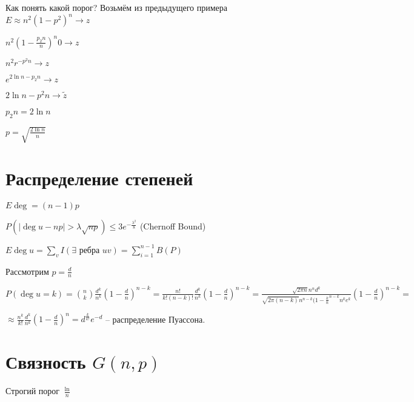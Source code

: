 \documentclass{book}
\theoremstyle{definition}
\newcommand{\tl}[1]{\widetilde{#1}}
\begin{document}
Как понять какой порог? Возьмём из предыдущего примера $E \approx n^2(1-p^2)^n \to z$

$n^2\left( 1 - \frac{p_2n}{n} \right) ^n 0\to z$

$n^2r^{-p^2n} \to z$

$e^{2\ln n - p_2n} \to z$

$2\ln n - p^2n \to \tl z$

$p_2n = 2\ln  n$

$p = \sqrt{\frac{2\ln n}{n}} $



\section{Распределение степеней}

$E\deg = (n-1)p$

 \begin{theorem}
     $P\left( \left| \deg u - np \right| >\lambda \sqrt{np}  \right) \leqslant 3 e^{-\frac{\lambda^2}{8}}$ (Chernoff Bound)

     $E \deg u = \sum_v I\left( \exists \text{ ребра }uv \right)  = \sum_{i=1}^{n-1} B(P)$
\end{theorem}

Рассмотрим $p = \frac{d}{n}$ 

$P(\deg u = k) = {n\choose k}\frac{d^k}{n^k}\left( 1 - \frac{d}{n} \right) ^{n-k} = \frac{n!}{k!(n-k)!} \frac{d^k}{n^k}\left( 1 - \frac{d}{n} \right) ^{n-k} = \frac{\sqrt{2\pi n} n^nd^k}{ \sqrt{2\pi (n-k)} n^{n-k}(1 - \frac{k}{n}^{n-k}n^k e^k}\left( 1 - \frac{d}{n} \right) ^{n-k} = $

$\approx \frac{n^k}{k!}\frac{d^k}{n^k}\left( 1 - \frac{d}{n} \right) ^n = d^\frac{k}{k!}e^{-d}$ -- распределение Пуассона.

\section{Связность $G(n, p)$}

Строгий порог $\frac{\ln }{n}$
\end{document}
